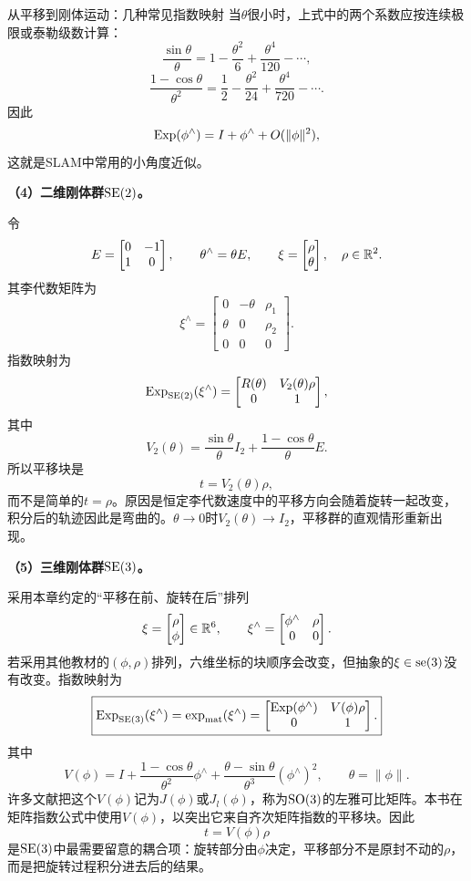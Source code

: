 \begin{lieexample}{从平移到刚体运动：几种常见指数映射}
当$\theta$很小时，上式中的两个系数应按连续极限或泰勒级数计算：
\[
    \frac{\sin\theta}{\theta}
    =1-\frac{\theta^2}{6}+\frac{\theta^4}{120}-\cdots,
\]
\[
    \frac{1-\cos\theta}{\theta^2}
    =\frac12-\frac{\theta^2}{24}+\frac{\theta^4}{720}-\cdots.
\]
因此
\[
    \operatorname{Exp}(\phi^\wedge)=I+\phi^\wedge+O(\|\phi\|^2),
\]
这就是SLAM中常用的小角度近似。

\textbf{（4）二维刚体群$\operatorname{SE}(2)$。}

令
\[
    E=\begin{bmatrix}0&-1\\1&0\end{bmatrix},
    \qquad
    \theta^\wedge=\theta E,
    \qquad
    \xi=\begin{bmatrix}\rho\\\theta\end{bmatrix},
    \quad \rho\in\mathbb{R}^2.
\]
其李代数矩阵为
\[
    \xi^\wedge=
    \begin{bmatrix}
        0&-\theta&\rho_1\\
        \theta&0&\rho_2\\
        0&0&0
    \end{bmatrix}.
\]
指数映射为
\[
    \operatorname{Exp}_{\operatorname{SE}(2)}(\xi^\wedge)
    =
    \begin{bmatrix}
        R(\theta)&V_2(\theta)\rho\\
        0&1
    \end{bmatrix},
\]
其中
\[
    V_2(\theta)
    =\frac{\sin\theta}{\theta}I_2
    +\frac{1-\cos\theta}{\theta}E.
\]
所以平移块是
\[
    t=V_2(\theta)\rho,
\]
而不是简单的$t=\rho$。原因是恒定李代数速度中的平移方向会随着旋转一起改变，积分后的轨迹因此是弯曲的。$\theta\to0$时$V_2(\theta)\to I_2$，平移群的直观情形重新出现。

\textbf{（5）三维刚体群$\operatorname{SE}(3)$。}

采用本章约定的“平移在前、旋转在后”排列
\[
    \xi=\begin{bmatrix}\rho\\\phi\end{bmatrix}\in\mathbb{R}^6,
    \qquad
    \xi^\wedge=
    \begin{bmatrix}
        \phi^\wedge&\rho\\
        0&0
    \end{bmatrix}.
\]
若采用其他教材的$(\phi,\rho)$排列，六维坐标的块顺序会改变，但抽象的$\xi\in\operatorname{se}(3)$没有改变。指数映射为
\[
    \boxed{
    \operatorname{Exp}_{\operatorname{SE}(3)}(\xi^\wedge)
    =\exp_{\mathrm{mat}}(\xi^\wedge)
    =
    \begin{bmatrix}
        \operatorname{Exp}(\phi^\wedge)&V(\phi)\rho\\
        0&1
    \end{bmatrix}.
    }
\]
其中
\[
    V(\phi)
    =I+\frac{1-\cos\theta}{\theta^2}\phi^\wedge
    +\frac{\theta-\sin\theta}{\theta^3}(\phi^\wedge)^2,
    \qquad \theta=\|\phi\|.
\]
许多文献把这个$V(\phi)$记为$J(\phi)$或$J_l(\phi)$，称为$\operatorname{SO}(3)$的左雅可比矩阵。本书在矩阵指数公式中使用$V(\phi)$，以突出它来自齐次矩阵指数的平移块。因此
\[
    \boxed{t=V(\phi)\rho}
\]
是$\operatorname{SE}(3)$中最需要留意的耦合项：旋转部分由$\phi$决定，平移部分不是原封不动的$\rho$，而是把旋转过程积分进去后的结果。
\end{lieexample}


